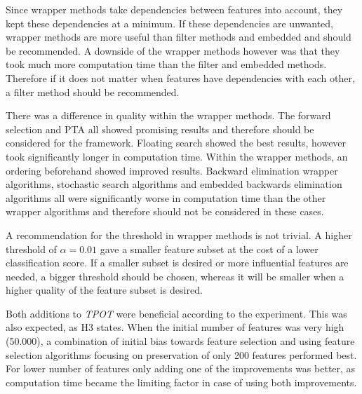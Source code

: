 \documentclass[10pt,a4paper]{report}
\begin{document}
	Since wrapper methods take dependencies between features into account, they kept these dependencies at a minimum. If these dependencies are unwanted, wrapper methods are more useful than filter methods and embedded and should be recommended. A downside of the wrapper methods however was that they took much more computation time than the filter and embedded methods. Therefore if it does not matter when features have dependencies with each other, a filter method should be recommended.
	
	There was a difference in quality within the wrapper methods. The forward selection and PTA all showed promising results and therefore should be considered for the framework. Floating search showed the best results, however took significantly longer in computation time. Within the wrapper methods, an ordering beforehand showed improved results. Backward elimination wrapper algorithms, stochastic search algorithms and embedded backwards elimination algorithms all were significantly worse in computation time than the other wrapper algorithms and therefore should not be considered in these cases.
	
	A recommendation for the threshold in wrapper methods is not trivial. A higher threshold of $\alpha = 0.01$ gave a smaller feature subset at the cost of a lower classification score. If a smaller subset is desired or more influential features are needed, a bigger threshold should be chosen, whereas it will be smaller when a higher quality of the feature subset is desired.
	
	Both additions to \textit{TPOT} were beneficial according to the experiment. This was also expected, as H3 states.  When the initial number of features was very high (50.000), a combination of initial bias towards feature selection and using feature selection algorithms focusing on preservation of only 200 features performed best. For lower number of features only adding one of the improvements was better, as computation time became the limiting factor in case of using both improvements.
	
	 
	
	
\end{document}
